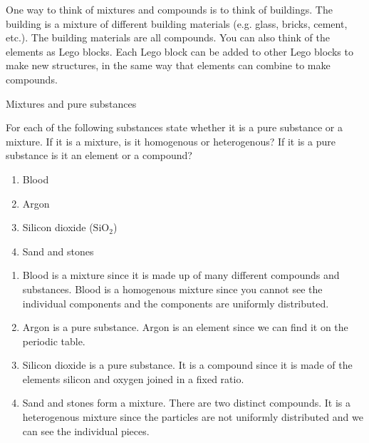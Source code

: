 \label{m38708*eip-595}One way to think of mixtures and compounds is to think of buildings. The building is a mixture of different building materials (e.g. glass, bricks, cement, etc.). The building materials are all compounds. You can also think of the elements as Lego blocks. Each Lego block can be added to other Lego blocks to make new structures, in the same way that elements can combine to make compounds. \par \label{m38708*eip-524}\vspace{.5cm} 
      \begin{wex}
{Mixtures and pure substances}
{For each of the following substances state whether it is a pure substance or a mixture. If it is a mixture, is it homogenous or heterogenous? If it is a pure substance is it an element or a compound? 
\label{m38708*eip-id1167351497334}\begin{enumerate}[noitemsep, label=\textbf{\alph*}. ] 
\item Blood
\item Argon
\item Silicon dioxide (${\mathrm{SiO}}_{2}$)
\item Sand and stones
\end{enumerate}
  \par }
{
 
\begin{enumerate}
[noitemsep, label=\textbf{\alph*}. ]
\item Blood is a mixture since it is made up of many different compounds and substances. Blood is a homogenous mixture since you cannot see the individual components and the components are uniformly distributed.
\item Argon is a pure substance. Argon is an element since we can find it on the periodic table.
\item Silicon dioxide is a pure substance. It is a compound since it is made of the elements silicon and oxygen joined in a fixed ratio.
\item Sand and stones form a mixture. There are two distinct compounds. It is a heterogenous mixture since the particles are not uniformly distributed and we can see the individual pieces.
\end{enumerate}}
    \end{wex}
